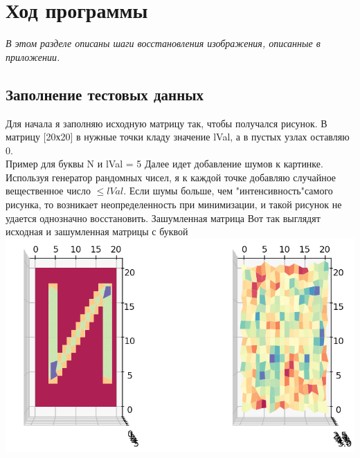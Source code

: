 \documentclass{report}
\newcommand{\ttt}{\hspace*{4mm}}
\begin{document}
\section*{Ход программы}
\ttt
\textit{В этом разделе описаны шаги восстановления изображения, описанные в приложении.} \\
\subsection*{Заполнение тестовых данных}
\ttt Для начала я заполняю исходную матрицу так, чтобы получался рисунок. В матрицу [20х20] в нужные точки кладу значение lVal, а в пустых узлах оставляю 0. \\
Пример для буквы N и lVal = 5
\flushleft
Далее идет добавление шумов к картинке. Используя генератор рандомных чисел, я к каждой точке добавляю случайное вещественное число $\leq lVal$. Если шумы больше, чем "интенсивность"\space самого рисунка, то возникает неопределенность при минимизации, и такой рисунок не удается однозначно восстановить. 
Зашумленная матрица
\clearpage
Вот так выглядят исходная и зашумленная матрицы с буквой
\\
\includegraphics[scale=0.6]{4.png}
\end{document}
